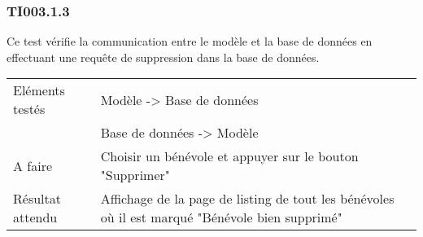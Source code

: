 
  	\subsubsection{TI003.1.3}
  	\label{TI003.1.3}
  		Ce test vérifie la communication entre le modèle et la base de données en effectuant une requête de suppression dans la base de données.
  		\begin{center}
    	 		\begin{tabular}[h]{|p{}|p{}|}
			\hline
				Eléments testés & Modèle -> Base de données  \\
							    &  Base de données -> Modèle \\\hline
    				A faire & Choisir un bénévole et appuyer sur le bouton "Supprimer" \\\hline
    				Résultat attendu & Affichage de la page de listing de tout les bénévoles où il est marqué "Bénévole bien supprimé" \\\hline  								  
     		\end{tabular}
  		\end{center}	